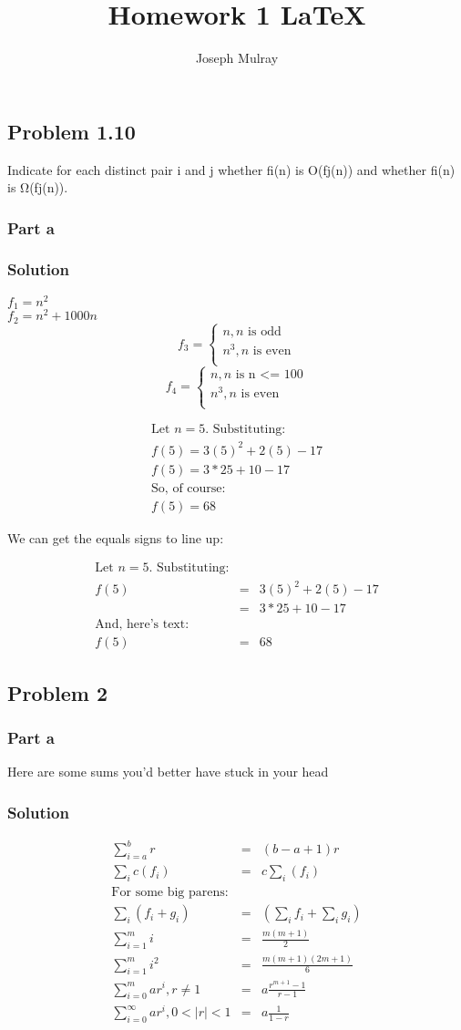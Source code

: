 \documentclass[10pt,letterpaper,oneside]{article}
\title{Homework 1	\LaTeX}
\author{Joseph Mulray}
\newcommand{\Problem}[1]{\subsection*{Problem #1}}
\newcommand{\Part}[1]{\subsubsection*{Part #1}}
\newcommand{\Solution}{\subsubsection*{Solution}}
\begin{document}
\maketitle

\Problem{1.10}

	Indicate for each distinct pair i and j whether fi(n) is O(fj(n)) and whether fi(n) is Ω(fj(n)).
	\Part{a}
	\Solution
	$f_1 = n^2$\\
	$f_2 = n^2 + 1000n$
	\[
		f_3= \left\lbrace%
		\begin{array}{cc}
		n, \text{$n$ is odd}\\
		n^3, \text{$n$ is even}\\
		\end{array} \right.
	\]
	\[
		f_4= \left\lbrace%
		\begin{array}{cc}
		n, \text{$n$ is n <= 100}\\
		n^3, \text{$n$ is even}\\
		\end{array} \right.
	\]	

	\begin{eqnarray*}
		\text{Let $n = 5$.  Substituting:} \\
		f(5) = 3(5)^2 + 2(5) - 17 \\
		f(5) = 3*25 + 10 - 17 \\
		\text{So, of course:} \\
		f(5) = 68 
	\end{eqnarray*}

	We can get the equals signs to line up:

	\begin{eqnarray*}
		\text{Let $n = 5$.  Substituting:} \\
		f(5) & = & 3(5)^2 + 2(5) - 17 \\
		     & = & 3*25 + 10 - 17 \\
		\text{And, here's text:} \\
		f(5) & = & 68 
	\end{eqnarray*}

\Problem{2}

	\Part{a}
	Here are some sums you'd better have stuck in your head

	\Solution
		\begin{eqnarray}
			\sum_{i=a}^b r  & = & (b-a+1)r \\
			\sum_{i} c(f_i) & = & c\sum_{i} (f_i) \\
			\text{For some big parens:} \\
			\sum_{i} (f_i+g_i) & = & \left(\sum_{i} f_i + \sum_{i} g_i\right) \\
			\sum_{i=1}^m i  & = & \frac{m(m+1)}{2} \\
			\sum_{i=1}^m i^2  & = & \frac{m(m+1)(2m+1)}{6} \\
			\sum_{i=0}^m ar^i, r\neq1  & = & a\frac{r^{m+1}-1}{r-1} \\
			\sum_{i=0}^\infty ar^i, 0<|r|<1  & = & a\frac{1}{1-r} 
		\end{eqnarray}
		
\end{document}
